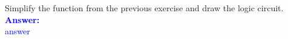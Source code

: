 \item{}
Simplify the function from the previous exercise and draw the logic circuit.\\[12pt]
\ifanswers
\textcolor{blue}{
\textbf{Answer:}\\
answer
}
\newpage
\fi

